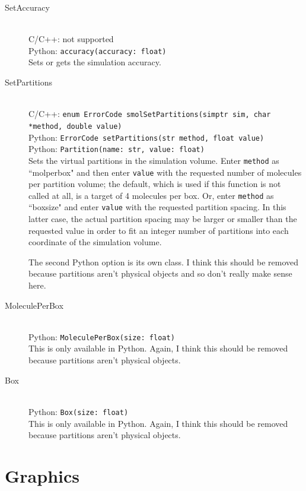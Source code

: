 \documentclass {book}
\newcommand {\ttt} {\texttt}
\begin{document}
\begin{description}
\item[SetAccuracy]
\hfill \\
C/C++: not supported\\
Python: \ttt{accuracy(accuracy: float)}\\
Sets or gets the simulation accuracy.

\item[SetPartitions]
\hfill \\
C/C++: \ttt{enum ErrorCode smolSetPartitions(simptr sim, char *method, double value)}\\
Python: \ttt{ErrorCode setPartitions(str method, float value)}\\
Python: \ttt{Partition(name: str, value: float)}\\
Sets the virtual partitions in the simulation volume. Enter \ttt{method} as ``molperbox" and then enter \ttt{value} with the requested number of molecules per partition volume; the default, which is used if this function is not called at all, is a target of 4 molecules per box. Or, enter \ttt{method} as ``boxsize" and enter \ttt{value} with the requested partition spacing. In this latter case, the actual partition spacing may be larger or smaller than the requested value in order to fit an integer number of partitions into each coordinate of the simulation volume.

The second Python option is its own class. I think this should be removed because partitions aren't physical objects and so don't really make sense here.

\item[MoleculePerBox]
\hfill \\
Python: \ttt{MoleculePerBox(size: float)}\\
This is only available in Python. Again, I think this should be removed because partitions aren't physical objects.

\item[Box]
\hfill \\
Python: \ttt{Box(size: float)}\\
This is only available in Python. Again, I think this should be removed because partitions aren't physical objects.


\end{description}

\section{Graphics}
\end{document}
